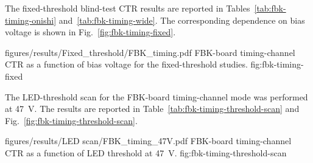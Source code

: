The fixed-threshold blind-test CTR results are reported in Tables~\ref{tab:fbk-timing-onishi} and~\ref{tab:fbk-timing-wide}. The corresponding dependence on bias voltage is shown in Fig.~\ref{fig:fbk-timing-fixed}.





\reportfigure
    {figures/results/Fixed_threshold/FBK_timing.pdf}
    {FBK-board timing-channel CTR as a function of bias voltage for the fixed-threshold studies.}
    {fig:fbk-timing-fixed}

The LED-threshold scan for the FBK-board timing-channel mode was performed at \SI{47}{V}. The results are reported in Table~\ref{tab:fbk-timing-threshold-scan} and Fig.~\ref{fig:fbk-timing-threshold-scan}.



\reportfigure
    {figures/results/LED scan/FBK_timing_47V.pdf}
    {FBK-board timing-channel CTR as a function of LED threshold at \SI{47}{V}.}
    {fig:fbk-timing-threshold-scan}
